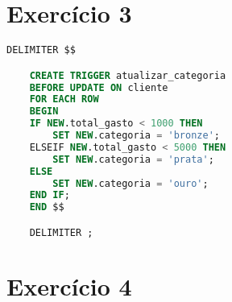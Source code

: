 \documentclass{article}
\begin{document}
\section*{Exercício 3}

\begin{lstlisting}[language=SQL]
    DELIMITER $$

    CREATE TRIGGER atualizar_categoria
    BEFORE UPDATE ON cliente
    FOR EACH ROW
    BEGIN
    IF NEW.total_gasto < 1000 THEN
        SET NEW.categoria = 'bronze';
    ELSEIF NEW.total_gasto < 5000 THEN
        SET NEW.categoria = 'prata';
    ELSE
        SET NEW.categoria = 'ouro';
    END IF;
    END $$

    DELIMITER ;
\end{lstlisting}

\section*{Exercício 4}
\end{document}
